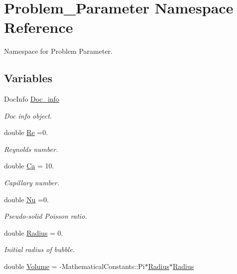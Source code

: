 \hypertarget{namespaceProblem__Parameter}{}\section{Problem\+\_\+\+Parameter Namespace Reference}
\label{namespaceProblem__Parameter}


Namespace for Problem Parameter.  


\subsection*{Variables}
\begin{DoxyCompactItemize}
\item 
Doc\+Info \hyperlink{namespaceProblem__Parameter_a1dd3c6bcf97360c8fe0d288ca7610351}{Doc\+\_\+info}
\begin{DoxyCompactList}\small\item\em Doc info object. \end{DoxyCompactList}\item 
double \hyperlink{namespaceProblem__Parameter_acc656299287d4d9a8374c2c501750b4f}{Re} =0.
\begin{DoxyCompactList}\small\item\em Reynolds number. \end{DoxyCompactList}\item 
double \hyperlink{namespaceProblem__Parameter_af6194d2571881779c678fbabc1503d47}{Ca} = 10.
\begin{DoxyCompactList}\small\item\em Capillary number. \end{DoxyCompactList}\item 
double \hyperlink{namespaceProblem__Parameter_abec2e733c8f2d3c18ebc702b3f80cc17}{Nu} =0.
\begin{DoxyCompactList}\small\item\em Pseudo-\/solid Poisson ratio. \end{DoxyCompactList}\item 
double \hyperlink{namespaceProblem__Parameter_a903237528f0e9bb92debcc8842576cca}{Radius} = 0.
\begin{DoxyCompactList}\small\item\em Initial radius of bubble. \end{DoxyCompactList}\item 
double \hyperlink{namespaceProblem__Parameter_aad8e0a2d1ec39a8dd7357a43bcc5f20e}{Volume} = -\/Mathematical\+Constants\+::\+Pi$\ast$\hyperlink{namespaceProblem__Parameter_a903237528f0e9bb92debcc8842576cca}{Radius}$\ast$\hyperlink{namespaceProblem__Parameter_a903237528f0e9bb92debcc8842576cca}{Radius}

\end{DoxyCompactItemize}

